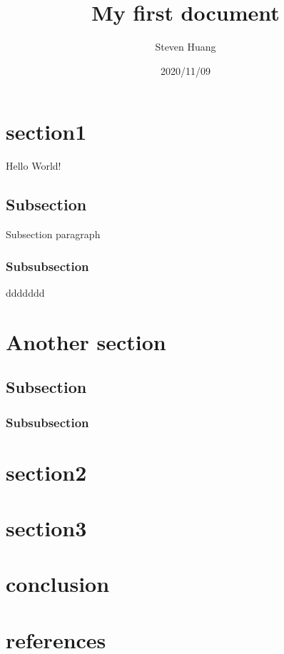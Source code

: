\documentclass{article}
\title{ My first document}
\date{2020/11/09}
\author{Steven Huang}
\begin{document}
\maketitle
\newpage

\doublespacing
\tableofcontents

\newpage


\section{section1}
Hello World!

\subsection{Subsection}
Subsection paragraph

\subsubsection{Subsubsection}
ddddddd


\section{Another section}
\subsection{Subsection}
\subsubsection{Subsubsection}

\section{section2}
\section{section3}
\section{conclusion}
\section{references}
\end{document}
